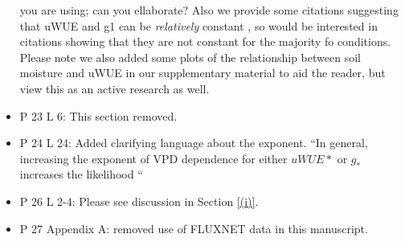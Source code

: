\documentclass[12pt]{article}
\begin{document}
\begin{itemize}
  you are using; can you ellaborate? Also we provide some citations
  suggesting that uWUE and g1 can be \textit{relatively} constant
  \citep{Lin_2005, Franks_2017, Zhou_2015}, so would be interested in
  citations showing that they are not constant for the majority fo
  conditions. Please note we also added some plots of the relationship
  between soil moisture and uWUE in our supplementary material to aid
  the reader, but view this as an active research as well.
\item P 23 L 6: This section removed.
\item P 24 L 24: Added clarifying language about the exponent.
  ``In general, increasing the exponent of VPD dependence for
  either $uWUE*$ or $g_*$ increases the likelihood ``
\item P 26 L 2-4: Please see discussion in Section \ref{(i)}.
\item P 27 Appendix A: removed use of FLUXNET data in this manuscript.
\end{itemize}



\end{document}
